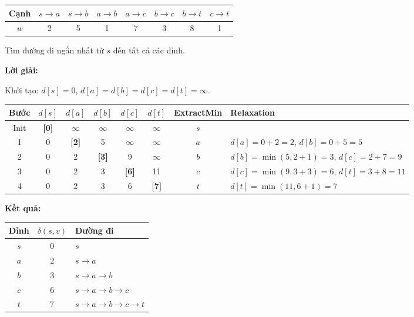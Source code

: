 \documentclass[10pt]{article}
\begin{document}
\begin{center}
\begin{tabular}{|c|c|c|c|c|c|c|c|}
\hline
Cạnh & $s \to a$ & $s \to b$ & $a \to b$ & $a \to c$ & $b \to c$ & $b \to t$ & $c \to t$ \\
\hline
$w$ & 2 & 5 & 1 & 7 & 3 & 8 & 1 \\
\hline
\end{tabular}
\end{center}

Tìm đường đi ngắn nhất từ $s$ đến tất cả các đỉnh.

\textbf{Lời giải:}

Khởi tạo: $d[s] = 0$, $d[a] = d[b] = d[c] = d[t] = \infty$.

\begin{center}
\begin{tabular}{|c|c|c|c|c|c|c|l|}
\hline
\textbf{Bước} & \textbf{$d[s]$} & \textbf{$d[a]$} & \textbf{$d[b]$} & \textbf{$d[c]$} & \textbf{$d[t]$} & \textbf{ExtractMin} & \textbf{Relaxation} \\
\hline
Init & \textbf{[0]} & $\infty$ & $\infty$ & $\infty$ & $\infty$ & $s$ & \\
\hline
1 & 0 & \textbf{[2]} & 5 & $\infty$ & $\infty$ & $a$ & $d[a]{=}0{+}2{=}2$, $d[b]{=}0{+}5{=}5$ \\
\hline
2 & 0 & 2 & \textbf{[3]} & 9 & $\infty$ & $b$ & $d[b]{=}\min(5, 2{+}1){=}3$, $d[c]{=}2{+}7{=}9$ \\
\hline
3 & 0 & 2 & 3 & \textbf{[6]} & 11 & $c$ & $d[c]{=}\min(9, 3{+}3){=}6$, $d[t]{=}3{+}8{=}11$ \\
\hline
4 & 0 & 2 & 3 & 6 & \textbf{[7]} & $t$ & $d[t]{=}\min(11, 6{+}1){=}7$ \\
\hline
\end{tabular}
\end{center}

\textbf{Kết quả:}

\begin{center}
\begin{tabular}{|c|c|l|}
\hline
\textbf{Đỉnh} & \textbf{$\delta(s, v)$} & \textbf{Đường đi} \\
\hline
$s$ & 0 & $s$ \\
\hline
$a$ & 2 & $s \to a$ \\
\hline
$b$ & 3 & $s \to a \to b$ \\
\hline
$c$ & 6 & $s \to a \to b \to c$ \\
\hline
$t$ & 7 & $s \to a \to b \to c \to t$ \\
\hline
\end{tabular}
\end{center}
\end{document}
